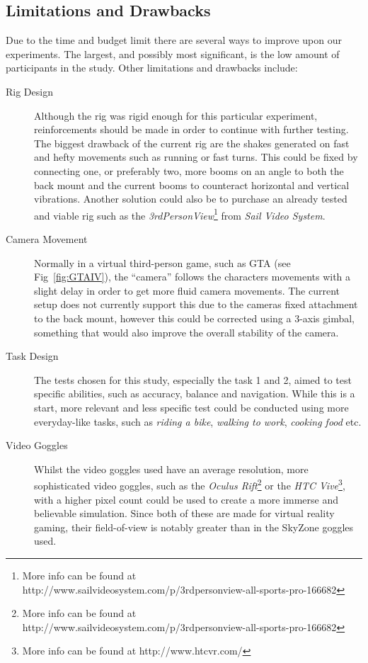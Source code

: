 \documentclass[runningheads,a4paper,oribibl]{llncs}
\begin{document}
\subsection{Limitations and Drawbacks}
Due to the time and budget limit there are several ways to improve upon our experiments. The largest, and possibly most significant, is the low amount of participants in the study. Other limitations and drawbacks include:
\begin{description}
	\item[Rig Design] Although the rig was rigid enough for this particular experiment, reinforcements should be made in order to continue with further testing. The biggest drawback of the current rig are the shakes generated on fast and hefty movements such as running or fast turns. This could be fixed by connecting one, or preferably two, more booms on an angle to both the back mount and the current booms to counteract horizontal and vertical vibrations. Another solution could also be to purchase an already tested and viable rig such as the \emph{3rdPersonView}\footnote{More info can be found at http://www.sailvideosystem.com/p/3rdpersonview-all-sports-pro-166682} from \emph{Sail Video System}.

	\item[Camera Movement] Normally in a virtual third-person game, such as GTA (see Fig~\ref{fig:GTAIV}), the ``camera'' follows the characters movements with a slight delay in order to get more fluid camera movements. The current setup does not currently support this due to the cameras fixed attachment to the back mount, however this could be corrected using a 3-axis gimbal, something that would also improve the overall stability of the camera.

	\item[Task Design] The tests chosen for this study, especially the task 1 and 2, aimed to test specific abilities, such as accuracy, balance and navigation. While this is a start, more relevant and less specific test could be conducted using more everyday-like tasks, such as \emph{riding a bike}, \emph{walking to work}, \emph{cooking food} etc.

	\item[Video Goggles] Whilst the video goggles used have an average resolution, more sophisticated video goggles, such as the \emph{Oculus Rift}\footnote{More info can be found at http://www.sailvideosystem.com/p/3rdpersonview-all-sports-pro-166682} or the \emph{HTC Vive}\footnote{More info can be found at http://www.htcvr.com/}, with a higher pixel count could be used to create a more immerse and believable simulation. Since both of these are made for virtual reality gaming, their field-of-view is notably greater than in the SkyZone goggles used.


\end{description}
\end{document}
